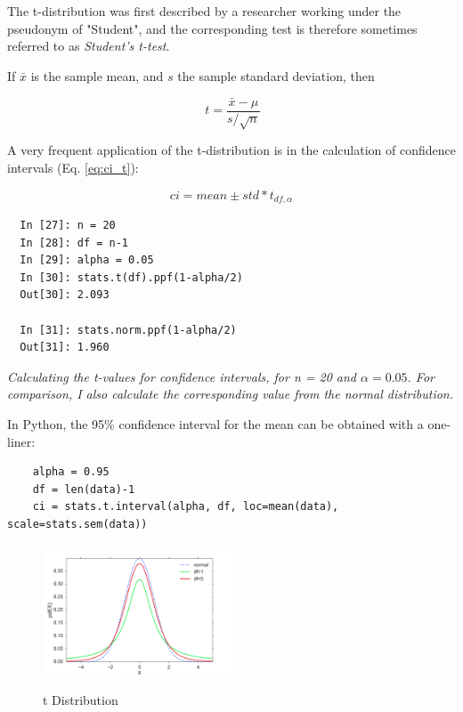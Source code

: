 The t-distribution was first described by a researcher working under the pseudonym of "Student", and the corresponding test is therefore sometimes referred to as \emph{Student's t-test}.

If $\bar{x}$ is the sample mean, and $s$ the sample standard deviation, then

\begin{equation}\
  t = \frac{\bar{x}-\mu}{s/ \sqrt{n}}
\end{equation}

A very frequent application of the t-distribution is in the calculation of confidence intervals (Eq. \ref{eq:ci_t}):

\begin{equation}
  ci = mean \pm std * t_{df,\alpha}
\end{equation}\label{eq:ci_t}

\begin{lstlisting}
  In [27]: n = 20
  In [28]: df = n-1
  In [29]: alpha = 0.05
  In [30]: stats.t(df).ppf(1-alpha/2)
  Out[30]: 2.093

  In [31]: stats.norm.ppf(1-alpha/2)
  Out[31]: 1.960
\end{lstlisting}

\emph{Calculating the t-values for confidence intervals, for n = 20 and $\alpha=0.05$. For comparison, I also calculate the corresponding value from the normal distribution.}

In Python, the 95\% confidence interval for the mean can be obtained with a one-liner:

\begin{lstlisting}
    alpha = 0.95
    df = len(data)-1
    ci = stats.t.interval(alpha, df, loc=mean(data), scale=stats.sem(data))
\end{lstlisting}

\begin{figure}
  \centering
  \includegraphics[width=0.5\textwidth]{../Images/dist_t.png}\\
  \caption{t Distribution}\label{fig:t}
\end{figure}

